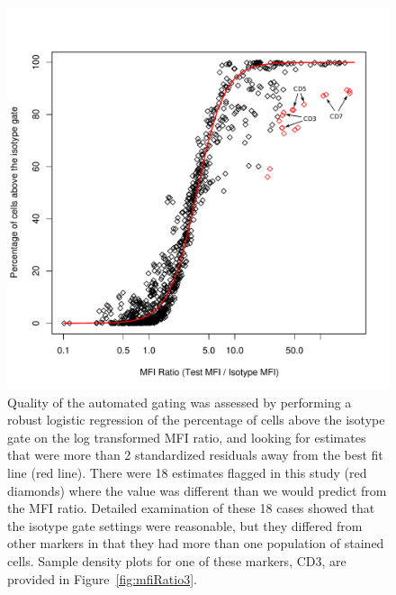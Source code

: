 \documentclass[12pt]{article}
\begin{document}
\begin{figure}
\centering
\includegraphics{mfiRatioB.pdf}
\caption{Quality of the automated gating was assessed by performing a robust
logistic regression of the percentage of cells above the isotype gate on the
log transformed MFI ratio, and looking for estimates that were more than 2
standardized residuals away from the best fit line (red line). There were 18
estimates flagged in this study (red diamonds) where the value was different
than we would predict from the MFI ratio. Detailed examination of these 18
cases showed that the isotype gate settings were reasonable, but they differed
from other markers in that they had more than one population of stained cells.
Sample density plots for one of these markers, CD3, are provided in
Figure~\ref{fig:mfiRatio3}.
}
\label{fig:mfiRatio}
\end{figure}
\end{document}
